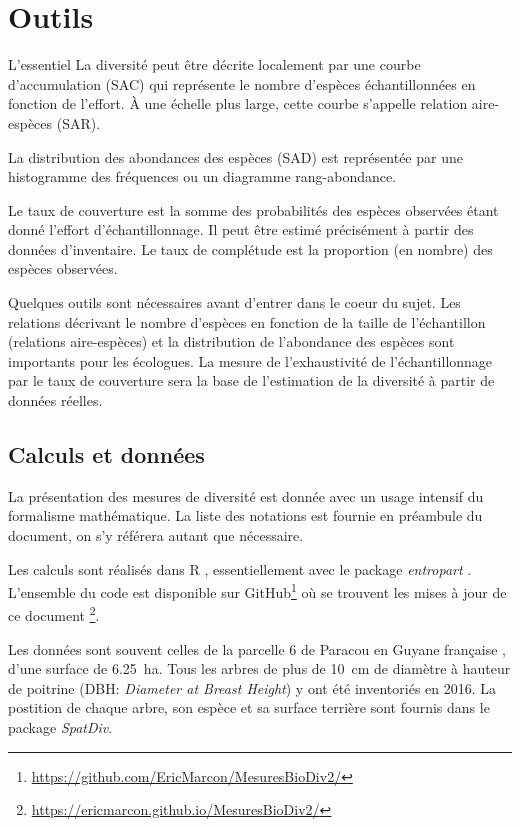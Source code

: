 \documentclass[
  11pt,
  french,
  a4paper,
  extrafontsizes,onecolumn,openright
  ]{memoir}
\newenvironment{Essentiel}
  {\begin{bclogo}[logo=\bctrombone, noborder=true, couleur=lightgray!50]{L'essentiel}\parindent0pt}
  {\end{bclogo}}
\begin{document}
\hypertarget{outils}{%
\chapter{Outils}\label{outils}}

\scriptsize

\begin{Essentiel}
La diversité peut être décrite localement par une courbe d'accumulation
(SAC) qui représente le nombre d'espèces échantillonnées en fonction de
l'effort. À une échelle plus large, cette courbe s'appelle relation
aire-espèces (SAR).

La distribution des abondances des espèces (SAD) est représentée par une
histogramme des fréquences ou un diagramme rang-abondance.

Le taux de couverture est la somme des probabilités des espèces
observées étant donné l'effort d'échantillonnage. Il peut être estimé
précisément à partir des données d'inventaire. Le taux de complétude est
la proportion (en nombre) des espèces observées.
\end{Essentiel}

\normalsize

Quelques outils sont nécessaires avant d'entrer dans le coeur du sujet.
Les relations décrivant le nombre d'espèces en fonction de la taille de l'échantillon (relations aire-espèces) et la distribution de l'abondance des espèces sont importants pour les écologues.
La mesure de l'exhaustivité de l'échantillonnage par le taux de couverture sera la base de l'estimation de la diversité à partir de données réelles.

\hypertarget{calculs-et-donnuxe9es}{%
\section{Calculs et données}\label{calculs-et-donnuxe9es}}

La présentation des mesures de diversité est donnée avec un usage intensif du formalisme mathématique.
La liste des notations est fournie en préambule du document, on s'y référera autant que nécessaire.

Les calculs sont réalisés dans R \autocite{R}, essentiellement avec le package \emph{entropart} \autocite{Marcon2014c}.
L'ensemble du code est disponible sur GitHub\footnote{\url{https://github.com/EricMarcon/MesuresBioDiv2/}} où se trouvent les mises à jour de ce document \footnote{\url{https://ericmarcon.github.io/MesuresBioDiv2/}}.

Les données sont souvent celles de la parcelle 6 de Paracou en Guyane française \autocite{Gourlet-Fleury2004}, d'une surface de 6.25~ha.
Tous les arbres de plus de 10~cm de diamètre à hauteur de poitrine (DBH: \emph{Diameter at Breast Height}) y ont été inventoriés en 2016.
La postition de chaque arbre, son espèce et sa surface terrière sont fournis dans le package \emph{SpatDiv}.
\end{document}
